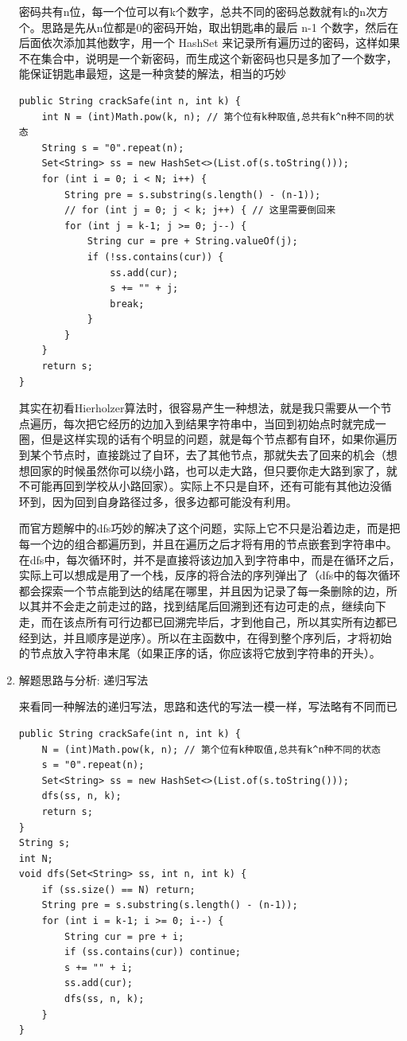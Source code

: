\documentclass[9pt, b5paaper]{book}
\begin{document}
\begin{enumerate}
密码共有n位，每一个位可以有k个数字，总共不同的密码总数就有k的n次方个。思路是先从n位都是0的密码开始，取出钥匙串的最后 n-1 个数字，然后在后面依次添加其他数字，用一个 HashSet 来记录所有遍历过的密码，这样如果不在集合中，说明是一个新密码，而生成这个新密码也只是多加了一个数字，能保证钥匙串最短，这是一种贪婪的解法，相当的巧妙

\begin{verbatim}
public String crackSafe(int n, int k) {
    int N = (int)Math.pow(k, n); // 第个位有k种取值,总共有k^n种不同的状态
    String s = "0".repeat(n);
    Set<String> ss = new HashSet<>(List.of(s.toString()));
    for (int i = 0; i < N; i++) {
        String pre = s.substring(s.length() - (n-1));
        // for (int j = 0; j < k; j++) { // 这里需要倒回来
        for (int j = k-1; j >= 0; j--) { 
            String cur = pre + String.valueOf(j);
            if (!ss.contains(cur)) {
                ss.add(cur);
                s += "" + j;
                break;
            }
        }
    }
    return s;
}
\end{verbatim}

其实在初看Hierholzer算法时，很容易产生一种想法，就是我只需要从一个节点遍历，每次把它经历的边加入到结果字符串中，当回到初始点时就完成一圈，但是这样实现的话有个明显的问题，就是每个节点都有自环，如果你遍历到某个节点时，直接跳过了自环，去了其他节点，那就失去了回来的机会（想想回家的时候虽然你可以绕小路，也可以走大路，但只要你走大路到家了，就不可能再回到学校从小路回家）。实际上不只是自环，还有可能有其他边没循环到，因为回到自身路径过多，很多边都可能没有利用。

而官方题解中的dfs巧妙的解决了这个问题，实际上它不只是沿着边走，而是把每一个边的组合都遍历到，并且在遍历之后才将有用的节点嵌套到字符串中。在dfs中，每次循环时，并不是直接将该边加入到字符串中，而是在循环之后，实际上可以想成是用了一个栈，反序的将合法的序列弹出了（dfs中的每次循环都会探索一个节点能到达的结尾在哪里，并且因为记录了每一条删除的边，所以其并不会走之前走过的路，找到结尾后回溯到还有边可走的点，继续向下走，而在该点所有可行边都已回溯完毕后，才到他自己，所以其实所有边都已经到达，并且顺序是逆序）。所以在主函数中，在得到整个序列后，才将初始的节点放入字符串末尾（如果正序的话，你应该将它放到字符串的开头）。

\item 解题思路与分析: 递归写法
\label{sec-1-5-1-3}

来看同一种解法的递归写法，思路和迭代的写法一模一样，写法略有不同而已

\begin{verbatim}
public String crackSafe(int n, int k) {
    N = (int)Math.pow(k, n); // 第个位有k种取值,总共有k^n种不同的状态
    s = "0".repeat(n);
    Set<String> ss = new HashSet<>(List.of(s.toString()));
    dfs(ss, n, k);
    return s;
}
String s;
int N;
void dfs(Set<String> ss, int n, int k) {
    if (ss.size() == N) return; 
    String pre = s.substring(s.length() - (n-1));
    for (int i = k-1; i >= 0; i--) {
        String cur = pre + i;
        if (ss.contains(cur)) continue;
        s += "" + i;
        ss.add(cur);
        dfs(ss, n, k);
    }
}
\end{verbatim}
\end{enumerate}
\end{document}
